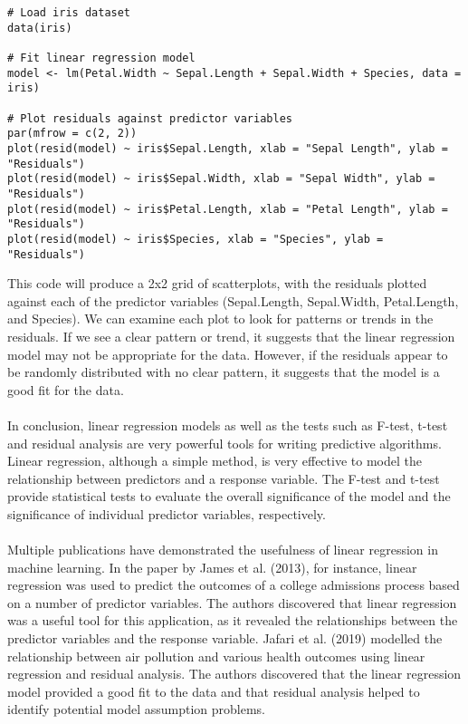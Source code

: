 \documentclass{article}[12pt]
\theoremstyle{definition}
\begin{document}
\begin{verbatim}
# Load iris dataset
data(iris)

# Fit linear regression model
model <- lm(Petal.Width ~ Sepal.Length + Sepal.Width + Species, data = iris)

# Plot residuals against predictor variables
par(mfrow = c(2, 2))
plot(resid(model) ~ iris$Sepal.Length, xlab = "Sepal Length", ylab = "Residuals")
plot(resid(model) ~ iris$Sepal.Width, xlab = "Sepal Width", ylab = "Residuals")
plot(resid(model) ~ iris$Petal.Length, xlab = "Petal Length", ylab = "Residuals")
plot(resid(model) ~ iris$Species, xlab = "Species", ylab = "Residuals")
\end{verbatim}

\bigskip

\noindent
This code will produce a 2x2 grid of scatterplots, with the residuals plotted against each of the predictor variables (Sepal.Length, Sepal.Width, Petal.Length, and Species). We can examine each plot to look for patterns or trends in the residuals. If we see a clear pattern or trend, it suggests that the linear regression model may not be appropriate for the data. However, if the residuals appear to be randomly distributed with no clear pattern, it suggests that the model is a good fit for the data.
\\
\\
In conclusion, linear regression models as well as the tests such as F-test, t-test and residual analysis are very powerful tools for writing predictive algorithms. Linear regression, although a simple method, is very effective to model the relationship between predictors and a response variable. The F-test and t-test provide statistical tests to evaluate the overall significance of the model and the significance of individual predictor variables, respectively. 
\\
\\
Multiple publications have demonstrated the usefulness of linear regression in machine learning. In the paper by James et al. (2013), for instance, linear regression was used to predict the outcomes of a college admissions process based on a number of predictor variables. 
The authors discovered that linear regression was a useful tool for this application, as it revealed the relationships between the predictor variables and the response variable. Jafari et al. (2019) modelled the relationship between air pollution and various health outcomes using linear regression and residual analysis. The authors discovered that the linear regression model provided a good fit to the data and that residual analysis helped to identify potential model assumption problems.
\end{document}
